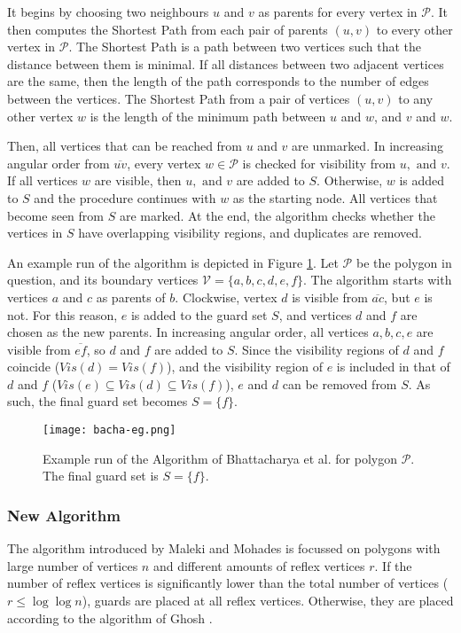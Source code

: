 It begins by choosing two neighbours $u$ and $v$ as parents for every vertex in $\mathcal P$. It then computes the Shortest Path from each pair of parents $(u, v)$ to every other vertex in $\mathcal P$. The Shortest Path is a path between two vertices such that the distance between them is minimal. If all distances between two adjacent vertices are the same, then the length of the path corresponds to the number of edges between the vertices. The Shortest Path from a pair of vertices $(u, v)$ to any other vertex $w$ is the length of the minimum path between $u$ and $w$, and $v$ and $w$.

Then, all vertices that can be reached from $u$ and $v$ are unmarked. In increasing angular order from $\overline{uv}$, every vertex $w \in \mathcal P$ is checked for visibility from $u, \text{ and } v$. If all vertices $w$ are visible, then $u, \text{ and }v$ are added to $S$. Otherwise, $w$ is added to $S$ and the procedure continues with $w$ as the starting node. All vertices that become seen from $S$ are marked. At the end, the algorithm checks whether the vertices in $S$ have overlapping visibility regions, and duplicates are removed.

An example run of the algorithm is depicted in Figure \ref{fig:bhaca}. Let $\mathcal P$ be the polygon in question, and its boundary vertices $\mathcal V = \{a, b, c, d, e, f\}$. The algorithm starts with vertices $a$ and $c$ as parents of $b$. Clockwise, vertex $d$ is visible from $\overline{ac}$, but $e$ is not. For this reason, $e$ is added to the guard set $S$, and vertices $d$ and $f$ are chosen as the new parents. In increasing angular order, all vertices $a, b, c, e$ are visible from $\overline{ef}$, so $d$ and $f$ are added to $S$. Since the visibility regions of $d$ and $f$ coincide ($Vis(d) = Vis(f)$), and the visibility region of $e$ is included in that of $d$ and $f$ ($Vis(e) \subseteq Vis(d) \subseteq Vis(f)$), $e$ and $d$ can be removed from $S$. As such, the final guard set becomes $S = \{f\}$.

\begin{figure}[h!]
    \centering
    \texttt{[image: bacha-eg.png]}
    \caption{Example run of the Algorithm of Bhattacharya et al. \cite{bhattacharya2016approximability} for polygon $\mathcal P$. The final guard set is $S = \{f\}$.}
    \label{fig:bhaca}
\end{figure}

\newpage
\subsubsection{New Algorithm}
The algorithm introduced by Maleki and Mohades is focussed on polygons with large number of vertices $n$ and different amounts of reflex vertices $r$. If the number of reflex vertices is significantly lower than the total number of vertices ($r \leq \log \log n$), guards are placed at all reflex vertices. Otherwise, they are placed according to the algorithm of Ghosh \cite{GHOSH2010718}.

